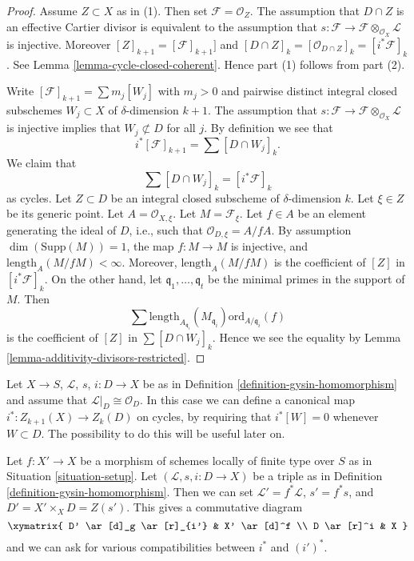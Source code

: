 \begin{proof}
Assume $Z \subset X$ as in (1). Then set $\mathcal{F} = \mathcal{O}_Z$.
The assumption that $D \cap Z$ is an effective Cartier divisor is
equivalent to the assumption that
$s : \mathcal{F} \to \mathcal{F} \otimes_{\mathcal{O}_X} \mathcal{L}$
is injective. Moreover $[Z]_{k + 1} = [\mathcal{F}]_{k + 1}]$
and $[D \cap Z]_k = [\mathcal{O}_{D \cap Z}]_k = [i^*\mathcal{F}]_k$.
See Lemma \ref{lemma-cycle-closed-coherent}.
Hence part (1) follows from part (2).

\medskip\noindent
Write $[\mathcal{F}]_{k + 1} = \sum m_j[W_j]$ with $m_j > 0$
and pairwise distinct integral closed subschemes $W_j \subset X$
of $\delta$-dimension $k + 1$. The assumption that
$s : \mathcal{F} \to \mathcal{F} \otimes_{\mathcal{O}_X} \mathcal{L}$
is injective implies that $W_j \not \subset D$ for all $j$.
By definition we see that
$$
i^*[\mathcal{F}]_{k + 1} = \sum [D \cap W_j]_k.
$$
We claim that
$$
\sum [D \cap W_j]_k = [i^*\mathcal{F}]_k
$$
as cycles.
Let $Z \subset D$ be an integral closed subscheme of $\delta$-dimension
$k$. Let $\xi \in Z$ be its generic point. Let $A = \mathcal{O}_{X, \xi}$.
Let $M = \mathcal{F}_\xi$. Let $f \in A$ be an element generating the
ideal of $D$, i.e., such that $\mathcal{O}_{D, \xi} = A/fA$.
By assumption $\dim(\text{Supp}(M)) = 1$,
the map $f : M \to M$ is injective, and
$\text{length}_A(M/fM) < \infty$. Moreover, $\text{length}_A(M/fM)$
is the coefficient of $[Z]$ in $[i^*\mathcal{F}]_k$. On the
other hand, let $\mathfrak q_1, \ldots, \mathfrak q_t$ be the minimal
primes in the support of $M$. Then
$$
\sum
\text{length}_{A_{\mathfrak q_i}}(M_{\mathfrak q_i})
\text{ord}_{A/\mathfrak q_i}(f)
$$
is the coefficient of $[Z]$ in $\sum [D \cap W_j]_k$.
Hence we see the equality by
Lemma \ref{lemma-additivity-divisors-restricted}.
\end{proof}

\begin{remark}
\label{remark-gysin-on-cycles}
Let $X \to S$, $\mathcal{L}$, $s$, $i : D \to X$ be as in
Definition \ref{definition-gysin-homomorphism} and assume
that $\mathcal{L}|_D \cong \mathcal{O}_D$. In this case we
can define a canonical map $i^* : Z_{k + 1}(X) \to Z_k(D)$
on cycles, by requiring that $i^*[W] = 0$ whenever $W \subset D$.
The possibility to do this will be useful later on.
\end{remark}

\begin{remark}
\label{remark-pullback-pairs}
Let $f : X' \to X$ be a morphism of schemes locally of finite type over $S$
as in Situation \ref{situation-setup}. Let $(\mathcal{L}, s, i : D \to X)$
be a triple as in Definition \ref{definition-gysin-homomorphism}.
Then we can set $\mathcal{L}' = f^*\mathcal{L}$, $s' = f^*s$, and
$D' = X' \times_X D = Z(s')$. This gives a commutative diagram
$$
\xymatrix{
D' \ar[d]_g \ar[r]_{i'} & X' \ar[d]^f \\
D \ar[r]^i & X
}
$$
and we can ask for various compatibilities between $i^*$ and $(i')^*$.
\end{remark}

